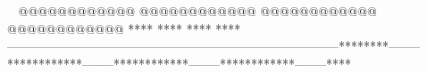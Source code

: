     @@@@@@@@@@@@        @@@@@@@@@@@@        @@@@@@@@@@@@        @@@@@@@@@@@@            ****                ****                ****                ****        --------------------------------------------------------------------------------********--------************--------************--------************--------****                                                                                